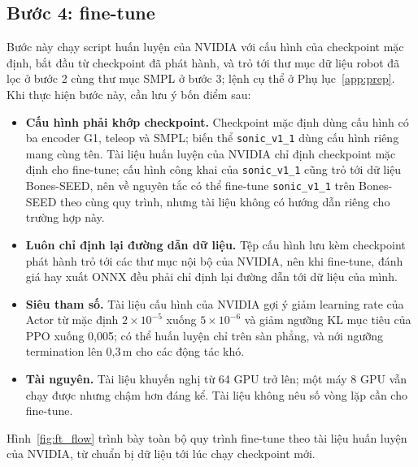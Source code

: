 \documentclass[12pt,a4paper,oneside]{report}
\newcommand{\code}[1]{\texttt{#1}}
\begin{document}
\subsection{Bước 4: fine-tune}

Bước này chạy script huấn luyện của NVIDIA với cấu hình của checkpoint mặc định, bắt đầu từ checkpoint đã phát hành, và trỏ tới thư mục dữ liệu robot đã lọc ở bước 2 cùng thư mục SMPL ở bước 3; lệnh cụ thể ở Phụ lục~\ref{app:prep}. Khi thực hiện bước này, cần lưu ý bốn điểm sau:
\begin{itemize}
\item \textbf{Cấu hình phải khớp checkpoint.} Checkpoint mặc định dùng cấu hình có ba encoder G1, teleop và SMPL; biến thể \code{sonic\_v1\_1} dùng cấu hình riêng mang cùng tên. Tài liệu huấn luyện của NVIDIA chỉ định checkpoint mặc định cho fine-tune; cấu hình công khai của \code{sonic\_v1\_1} cũng trỏ tới dữ liệu Bones-SEED, nên về nguyên tắc có thể fine-tune \code{sonic\_v1\_1} trên Bones-SEED theo cùng quy trình, nhưng tài liệu không có hướng dẫn riêng cho trường hợp này.
\item \textbf{Luôn chỉ định lại đường dẫn dữ liệu.} Tệp cấu hình lưu kèm checkpoint phát hành trỏ tới các thư mục nội bộ của NVIDIA, nên khi fine-tune, đánh giá hay xuất ONNX đều phải chỉ định lại đường dẫn tới dữ liệu của mình.
\item \textbf{Siêu tham số.} Tài liệu cấu hình của NVIDIA gợi ý giảm learning rate của Actor từ mặc định $2 \times 10^{-5}$ xuống $5 \times 10^{-6}$ và giảm ngưỡng KL mục tiêu của PPO xuống 0,005; có thể huấn luyện chỉ trên sàn phẳng, và nới ngưỡng termination lên 0,3\,m cho các động tác khó.
\item \textbf{Tài nguyên.} Tài liệu khuyến nghị từ 64 GPU trở lên; một máy 8 GPU vẫn chạy được nhưng chậm hơn đáng kể. Tài liệu không nêu số vòng lặp cần cho fine-tune.
\end{itemize}

Hình~\ref{fig:ft_flow} trình bày toàn bộ quy trình fine-tune theo tài liệu huấn luyện của NVIDIA, từ chuẩn bị dữ liệu tới lúc chạy checkpoint mới.
\end{document}
